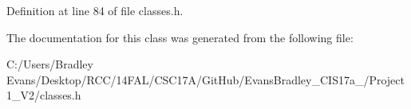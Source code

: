 Definition at line 84 of file classes.\+h.



The documentation for this class was generated from the following file\+:\begin{DoxyCompactItemize}
\item 
C\+:/\+Users/\+Bradley Evans/\+Desktop/\+R\+C\+C/14\+F\+A\+L/\+C\+S\+C17\+A/\+Git\+Hub/\+Evans\+Bradley\+\_\+\+C\+I\+S17a\+\_/\+Project 1\+\_\+\+V2/classes.\+h\end{DoxyCompactItemize}
